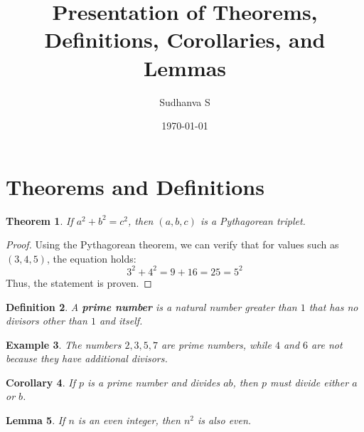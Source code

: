 \documentclass{article}
\newtheorem{theorem}{Theorem}[section]
\newtheorem{definition}[theorem]{Definition}
\newtheorem{corollary}[theorem]{Corollary}
\newtheorem{lemma}[theorem]{Lemma}
\newtheorem{example}[theorem]{Example}
\begin{document}
\title{Presentation of Theorems, Definitions, Corollaries, and Lemmas}
\author{Sudhanva S}
\date{\today}
\maketitle

\section{Theorems and Definitions}

\begin{theorem}
If \( a^2 + b^2 = c^2 \), then \( (a, b, c) \) is a Pythagorean triplet.
\end{theorem}

\begin{proof}
Using the Pythagorean theorem, we can verify that for values such as \( (3, 4, 5) \), the equation holds: \[ 3^2 + 4^2 = 9 + 16 = 25 = 5^2 \]
Thus, the statement is proven.
\end{proof}

\begin{definition}
A \textbf{prime number} is a natural number greater than \(1\) that has no divisors other than \(1\) and itself.
\end{definition}

\begin{example}
The numbers \(2, 3, 5, 7\) are prime numbers, while \(4\) and \(6\) are not because they have additional divisors.
\end{example}

\begin{corollary}
If \( p \) is a prime number and divides \( ab \), then \( p \) must divide either \( a \) or \( b \).
\end{corollary}

\begin{lemma}
If \( n \) is an even integer, then \( n^2 \) is also even.
\end{lemma}
\end{document}
